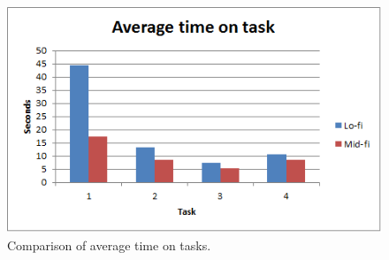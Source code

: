 \begin{figure}[H]
\centering
\includegraphics[width=.7\textwidth]{billeder/AverageTime}
\caption{Comparison of average time on tasks.}
\end{figure}
